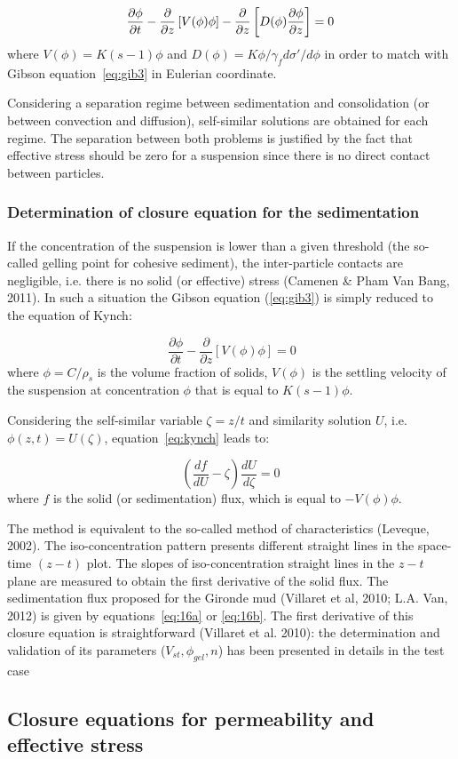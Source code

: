 \begin{equation*}
\dfrac{\partial \phi }{\partial t} -\dfrac{\partial }{\partial z} \left[
V(\phi )\phi \right] -\dfrac{\partial }{\partial z} \left[ D(\phi )\dfrac{%
\partial \phi }{\partial z} \right] =0 
\end{equation*}%
where $V(\phi)=K(s-1)\phi$ and $D(\phi)=K\phi/\gamma_f d\sigma'/d\phi$ 
in order to match with Gibson equation~\ref{eq:gib3} in Eulerian coordinate.

Considering a separation regime between sedimentation and consolidation (or
between convection and diffusion), self-similar solutions are obtained for
each regime. The separation between both problems is justified by the fact
that effective stress should be zero for a suspension since there is no
direct contact between particles.

\subsubsection{Determination of closure equation for the sedimentation}
If the concentration of the suspension is lower than a given threshold (the
so-called gelling point for cohesive sediment), the inter-particle contacts
are negligible, i.e. there is no solid (or effective) stress (Camenen \&
Pham Van Bang, 2011). In such a situation the Gibson equation (\ref{eq:gib3}) is
simply reduced to the equation of Kynch:

\begin{equation}~\label{eq:kynch}
\dfrac{\partial \phi }{\partial t} -\dfrac{\partial }{\partial z} \left[
V(\phi )\phi \right] =0 
\end{equation}%
where $\phi =C/\rho _s$ is the volume fraction of solids, $V(\phi)$ is the
settling velocity of the suspension at concentration $\phi$ that is equal to
$K(s-1)\phi$.

Considering the self-similar variable $\zeta=z/t$ and similarity solution $U$,
i.e. $\phi(z,t)=U(\zeta)$, equation~\ref{eq:kynch} leads to:

\begin{equation*}
\left(\dfrac{df}{dU} -\zeta \right) \dfrac{dU}{d\zeta} = 0 
\end{equation*}
where $f$ is the solid (or sedimentation) flux, which is equal to $-V(\phi)\phi$.

The method is equivalent to the so-called method of characteristics
(Leveque, 2002). The iso-concentration pattern presents different straight
lines in the space-time $(z-t)$ plot. The slopes of iso-concentration straight
lines in the $z-t$ plane are measured to obtain the first derivative of the
solid flux. The sedimentation flux proposed for the Gironde mud (Villaret et
al, 2010; L.A. Van, 2012) is given by equations~\ref{eq:16a} or \ref{eq:16b}. The first
derivative of this closure equation is straightforward (Villaret et al.
2010): the determination and validation of its parameters ($V_{st}, \phi_{gel}, n$) 
has been presented in details in the test case \subsection{Closure equations for permeability and effective stress}\label{sec:4.5}

